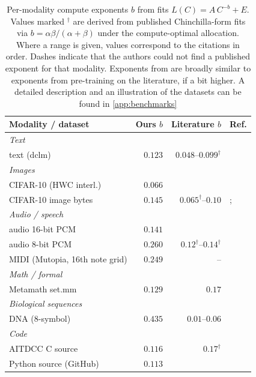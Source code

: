 \begin{table}[t]
  \centering
  \small
  \begin{tabular}{l r r l}
  \toprule
  Modality / dataset & Ours $b$ & Literature $b$ & Ref. \\
  \midrule
  \multicolumn{4}{l}{\emph{Text}} \\
  text (dclm) & $0.123$ & $0.048$--$0.099^{\dagger}$ & \citet{henighan2020scaling,aghajanyan2023scaling} \\
  \midrule
  \multicolumn{4}{l}{\emph{Images}} \\
  CIFAR-10 (HWC interl.) & $0.066$ &  &  \\
  CIFAR-10 image bytes   & $0.145$ & $0.065^{\dagger}$--$0.10$ & \citet{aghajanyan2023scaling}; \citet{henighan2020scaling} \\
  \midrule
  \multicolumn{4}{l}{\emph{Audio / speech}} \\
  audio 16-bit PCM               & $0.141$ &  &  \\
  audio 8-bit PCM                & $0.260$ & $0.12^{\dagger}$--$0.14^{\dagger}$ & \citet{cuervo2024scaling,aghajanyan2023scaling} \\
  MIDI (Mutopia, 16th note grid) & $0.249$ & -- &  \\
  \midrule
  \multicolumn{4}{l}{\emph{Math / formal}} \\
  Metamath set.mm & $0.129$ & $0.17$ & \citet{henighan2020scaling} \\
  \midrule
  \multicolumn{4}{l}{\emph{Biological sequences}} \\
  DNA (8-symbol) & $0.435$ & $0.01$--$0.06$ & \citet{shah2026dnahnet} \\
  \midrule
  \multicolumn{4}{l}{\emph{Code}} \\
  AITDCC C source        & $0.116$ & $0.17^{\dagger}$ & \citet{aghajanyan2023scaling} \\
  Python source (GitHub) & $0.113$ &  &  \\
  \bottomrule
  \end{tabular}
  \caption{
Per-modality compute exponents $b$ from fits $L(C)=A\,C^{-b}+E$. Values marked $^{\dagger}$ are derived from published Chinchilla-form fits via $b=\alpha\beta/(\alpha+\beta)$ under the compute-optimal allocation. Where a range is given, values correspond to the citations in order. Dashes indicate that the authors could not find a published exponent for that modality. Exponents from \method{} are broadly similar to exponents from pre-training on the literature, if a bit higher. A detailed description and an illustration of the datasets can be found in \cref{app:benchmarks}}
  \label{tab:scaling_exponents}
  \end{table}